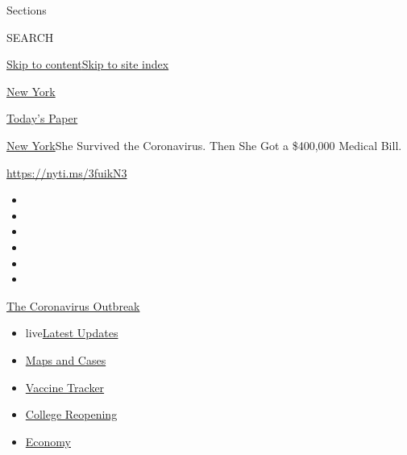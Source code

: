 Sections

SEARCH

\protect\hyperlink{site-content}{Skip to
content}\protect\hyperlink{site-index}{Skip to site index}

\href{https://www.nytimes.com/section/nyregion}{New York}

\href{https://myaccount.nytimes.com/auth/login?response_type=cookie\&client_id=vi}{}

\href{https://www.nytimes.com/section/todayspaper}{Today's Paper}

\href{/section/nyregion}{New York}\textbar{}She Survived the
Coronavirus. Then She Got a \$400,000 Medical Bill.

\url{https://nyti.ms/3fuikN3}

\begin{itemize}
\item
\item
\item
\item
\item
\item
\end{itemize}

\href{https://www.nytimes.com/news-event/coronavirus?action=click\&pgtype=Article\&state=default\&region=TOP_BANNER\&context=storylines_menu}{The
Coronavirus Outbreak}

\begin{itemize}
\tightlist
\item
  live\href{https://www.nytimes.com/2020/08/04/world/coronavirus-cases.html?action=click\&pgtype=Article\&state=default\&region=TOP_BANNER\&context=storylines_menu}{Latest
  Updates}
\item
  \href{https://www.nytimes.com/interactive/2020/us/coronavirus-us-cases.html?action=click\&pgtype=Article\&state=default\&region=TOP_BANNER\&context=storylines_menu}{Maps
  and Cases}
\item
  \href{https://www.nytimes.com/interactive/2020/science/coronavirus-vaccine-tracker.html?action=click\&pgtype=Article\&state=default\&region=TOP_BANNER\&context=storylines_menu}{Vaccine
  Tracker}
\item
  \href{https://www.nytimes.com/2020/08/02/us/covid-college-reopening.html?action=click\&pgtype=Article\&state=default\&region=TOP_BANNER\&context=storylines_menu}{College
  Reopening}
\item
  \href{https://www.nytimes.com/live/2020/08/04/business/stock-market-today-coronavirus?action=click\&pgtype=Article\&state=default\&region=TOP_BANNER\&context=storylines_menu}{Economy}
\end{itemize}

